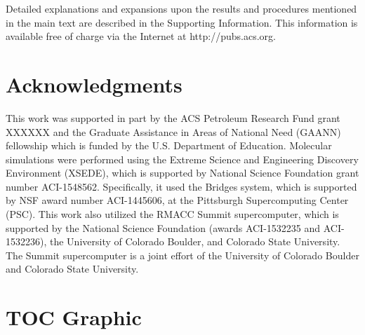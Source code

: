 \documentclass{article}
\begin{document}
  Detailed explanations and expansions upon the results and procedures mentioned in
  the main text are described in the Supporting Information. This information is
  available free of charge via the Internet at http://pubs.acs.org.

  \section*{Acknowledgments}
  This work was supported in part by the ACS Petroleum Research Fund grant XXXXXX 
  and the Graduate Assistance in Areas of National Need (GAANN)
  fellowship which is funded by the U.S. Department of Education.
  Molecular simulations were performed using the Extreme Science and
  Engineering Discovery Environment (XSEDE), which is supported by National
  Science Foundation grant number ACI-1548562. Specifically, it used the Bridges
  system, which is supported by NSF award number ACI-1445606, at the Pittsburgh
  Supercomputing Center (PSC). This work also utilized the RMACC Summit supercomputer,
  which is supported by the National Science Foundation (awards ACI-1532235 and
  ACI-1532236), the University of Colorado Boulder, and Colorado State
  University. The Summit supercomputer is a joint effort of the University of
  Colorado Boulder and Colorado State University.

  \clearpage

  
  

  \newpage

  \section*{TOC Graphic}
\end{document}
